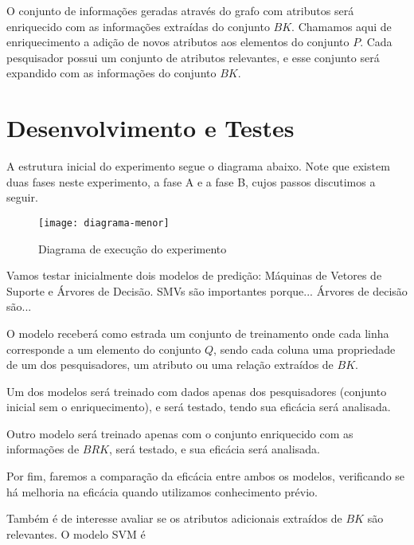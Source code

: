 
O conjunto de informações geradas através do grafo com atributos será enriquecido com as informações extraídas do conjunto $BK$. Chamamos aqui de enriquecimento a adição de novos atributos aos elementos do conjunto $P$. Cada pesquisador possui um conjunto de atributos relevantes, e esse conjunto será expandido com as informações do conjunto $BK$.


\section{Desenvolvimento e Testes}
\label{sec:desenvolvimento-testes}

A estrutura inicial do experimento segue o diagrama abaixo. Note que existem duas fases neste experimento, a fase A e a fase B, cujos passos discutimos a seguir.

\begin{figure}[!h]
  \centering
  \texttt{[image: diagrama-menor]}
  \caption{Diagrama de execução do experimento}
  \label{fig:diagrama-experimento}
\end{figure}


Vamos testar inicialmente dois modelos de predição: Máquinas de Vetores de Suporte e Árvores de Decisão.
SMVs são importantes porque...
Árvores de decisão são...

O modelo receberá como estrada um conjunto de treinamento onde cada linha corresponde a um elemento do conjunto $Q$, sendo cada coluna uma propriedade de um dos pesquisadores, um atributo ou uma relação extraídos de $BK$.

Um dos modelos será treinado com dados apenas dos pesquisadores (conjunto inicial sem o enriquecimento), e será testado, tendo sua eficácia será analisada.

Outro modelo será treinado apenas com o conjunto enriquecido com as informações de $BRK$, será testado, e sua eficácia será analisada.

Por fim, faremos a comparação da eficácia entre ambos os modelos, verificando se há melhoria na eficácia quando utilizamos conhecimento prévio.

Também é de interesse avaliar se os atributos adicionais extraídos de $BK$ são relevantes. O modelo SVM é %


